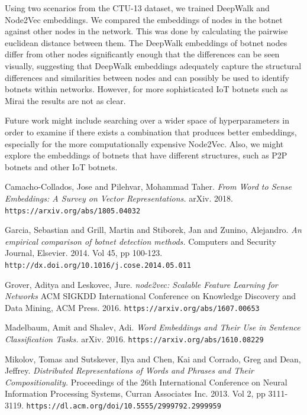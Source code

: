 \documentclass[10pt]{article}
\begin{document}
\begin{multicols}{2}
Using two scenarios from the CTU-13 dataset, we trained DeepWalk and Node2Vec embeddings. We compared the embeddings of nodes in the botnet against other nodes in the network. This was done by calculating the pairwise euclidean distance between them. The DeepWalk embeddings of botnet nodes differ from other nodes significantly enough that the differences can be seen visually, suggesting that DeepWalk embeddings adequately capture the structural differences and similarities between nodes and can possibly be used to identify botnets within networks. However, for more sophisticated IoT botnets such as Mirai the results are not as clear. \newline

Future work might include searching over a wider space of hyperparameters in order to examine if there exists a combination that produces better embeddings, especially for the more computationally expensive Node2Vec. Also, we might explore the embeddings of botnets that have different structures, such as P2P botnets and other IoT botnets. 

\begin{thebibliography}{5}

Camacho-Collados, Jose and Pilehvar, Mohammad Taher.
\textit{From Word to Sense Embeddings: A Survey on Vector Representations.}
arXiv. 2018.
\texttt{https://arxiv.org/abs/1805.04032}

Garcia, Sebastian and Grill, Martin and Stiborek, Jan and Zunino, Alejandro.
\textit{An empirical comparison of botnet detection methods.}
Computers and Security Journal, Elsevier. 2014. Vol 45, pp 100-123.
\texttt{http://dx.doi.org/10.1016/j.cose.2014.05.011}

Grover, Aditya and Leskovec, Jure.
\textit{node2vec: Scalable Feature Learning for Networks}
ACM SIGKDD International Conference on Knowledge Discovery and Data Mining, ACM Press. 2016.
\texttt{https://arxiv.org/abs/1607.00653}

Madelbaum, Amit and Shalev, Adi.
\textit{Word Embeddings and Their Use in Sentence Classification Tasks.}
arXiv. 2016. 
\texttt{https://arxiv.org/abs/1610.08229}

Mikolov, Tomas and Sutskever, Ilya and Chen, Kai and Corrado, Greg and Dean, Jeffrey.
\textit{Distributed Representations of Words and Phrases and Their Compositionality.}
Proceedings of the 26th International Conference on Neural Information Processing Systems, Curran Associates Inc. 2013. Vol 2, pp 3111-3119.
\texttt{https://dl.acm.org/doi/10.5555/2999792.2999959}


\end{thebibliography}
\end{multicols}
\end{document}

